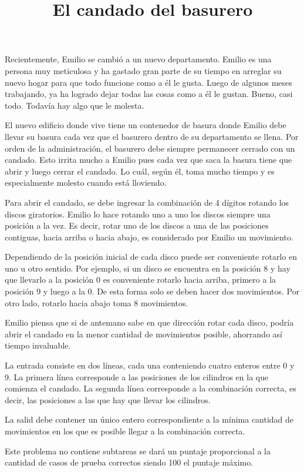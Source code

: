 \documentclass{oci}
\title{El candado del basurero}
\begin{document}
\begin{problemDescription}
  Recientemente, Emilio se cambió a un nuevo departamento.
  Emilio es una persona muy meticulosa y ha gastado gran parte de su tiempo en arreglar su
  nuevo hogar para que todo funcione como a él le gusta.
  Luego de algunos meses trabajando, ya ha logrado dejar todas las cosas como a él le gustan.
  Bueno, casi todo.
  Todavía hay algo que le molesta.

  El nuevo edificio donde vive tiene un contenedor de basura donde Emilio
  debe llevar su basura cada vez que el basurero dentro de su departamento se llena.
  Por orden de la administración, el basurero debe siempre permanecer cerrado con un
  candado.
  Esto irrita mucho a Emilio pues cada vez que saca la basura tiene que abrir y luego cerrar
  el candado.
  Lo cuál, según él, toma mucho tiempo y es especialmente molesto cuando está lloviendo.

  Para abrir el candado, se debe ingresar la combinación de 4 dígitos rotando los discos
  giratorios.
  Emilio lo hace rotando uno a uno los discos siempre una posición a la vez.
  Es decir, rotar uno de los discos a una de las posiciones contiguas, hacia arriba o hacia abajo, es
  considerado por Emilio un movimiento.

  Dependiendo de la posición inicial de cada disco puede ser conveniente rotarlo en uno u otro
  sentido.
  Por ejemplo, si un disco se encuentra en la posición 8 y hay que llevarlo a la posición 0 es
  conveniente rotarlo hacia arriba, primero a la posición 9 y luego a la 0.
  De esta forma solo se deben hacer dos movimientos.
  Por otro lado, rotarlo hacia abajo toma 8 movimientos.

  Emilio piensa que si de antemano sabe en que dirección rotar cada disco, podría abrir el candado en
  la menor cantidad de movimientos posible, ahorrando así tiempo invaluable.
\end{problemDescription}

\begin{inputDescription}
  La entrada consiste en dos líneas, cada una conteniendo cuatro enteros entre 0 y 9.
  La primera línea corresponde a las posiciones de los cilindros en la que comienza el candado.
  La segunda línea corresponde a la combinación correcta, es decir, las posiciones a las
  que hay que llevar los cilindros.
\end{inputDescription}

\begin{outputDescription}
  La salid debe contener un único entero correspondiente a la mínima cantidad de movimientos en los
  que es posible llegar a la combinación correcta.
\end{outputDescription}

\begin{scoreDescription}
  Este problema no contiene subtareas se dará un puntaje proporcional a la cantidad de casos de
  prueba correctos siendo 100 el puntaje máximo.
\end{scoreDescription}

\begin{sampleDescription}
\end{sampleDescription}
\end{document}
